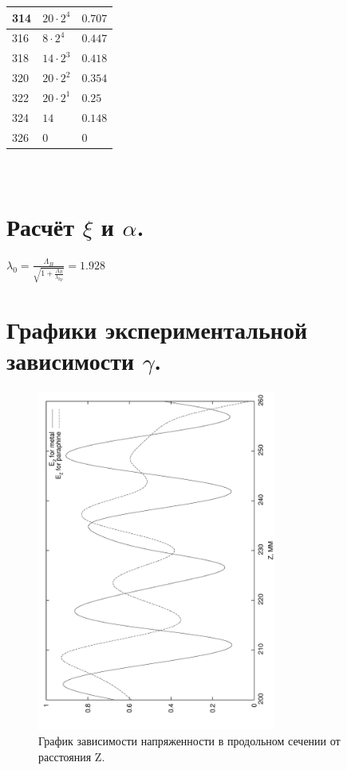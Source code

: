 \documentclass[a4paper, titlepage, 10pt]{article}
\begin{document}
\begin{minipage}{0.4\textwidth}
\begin{center}
\begin{tabular}{|l|l|l|}
  \hline
  314 & \( 20 \cdot 2^4 \) & \( 0.707 \) \\
  \hline
  316 & \( 8 \cdot 2^4 \) & \( 0.447 \) \\
  \hline
  318 & \( 14 \cdot 2^3 \) & \( 0.418 \) \\
  \hline
  320 & \( 20 \cdot 2^2 \) & \( 0.354 \) \\
  \hline
  322 & \( 20 \cdot 2^1 \) & \( 0.25 \) \\
  \hline
  324 & \( 14 \) & \( 0.148 \) \\
  \hline
  326 & \( 0 \) & \( 0 \) \\
  \hline
 \end{tabular}
\end{center}
\end{minipage}

\appendix
\section*{\\[1cm]Расчёт \( \xi\) и \(  \alpha \).}
\( \lambda_{0} = \frac{\Lambda_B}{\sqrt{1 + \frac{\Lambda_B}{\lambda_{kp}}} } = 1.928\)

\appendix
\section*{Графики экспериментальной зависимости \( \gamma \).}

\begin{figure}[h!]
 \centering
 \includegraphics[angle = 270,width=0.7\textwidth]{Ez}
 \caption{График зависимости напряженности в продольном сечении от расстояния Z.}
\end{figure}
\end{document}
